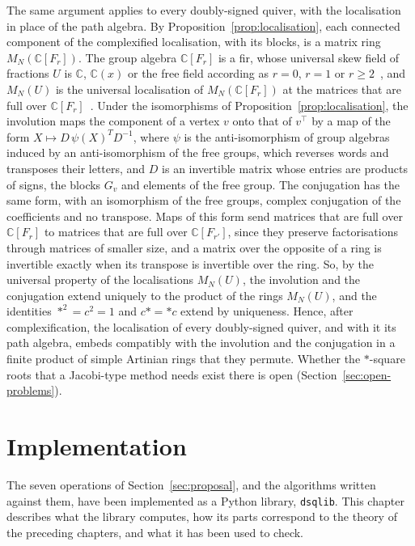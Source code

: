 \documentclass[12pt, a4paper]{report}
\theoremstyle{plain}
\theoremstyle{definition}
\theoremstyle{remark}
\theoremstyle{plain}
\newcommand{\CC}{\mathbb{C}}
\begin{document}
The same argument applies to every doubly-signed quiver, with the localisation in place of the path algebra. By Proposition~\ref{prop:localisation}, each connected component of the complexified localisation, with its blocks, is a matrix ring $M_N(\CC[F_r])$. The group algebra $\CC[F_r]$ is a fir, whose universal skew field of fractions $U$ is $\CC$, $\CC(x)$ or the free field according as $r=0$, $r=1$ or $r\geq2$~\cite{Cohn2006,Lewin1974}, and $M_N(U)$ is the universal localisation of $M_N(\CC[F_r])$ at the matrices that are full over $\CC[F_r]$~\cite[Chapter~7]{Cohn2006}. Under the isomorphisms of Proposition~\ref{prop:localisation}, the involution maps the component of a vertex $v$ onto that of $v^{\top}$ by a map of the form $X\mapsto D\,\psi(X)^TD^{-1}$, where $\psi$ is the anti-isomorphism of group algebras induced by an anti-isomorphism of the free groups, which reverses words and transposes their letters, and $D$ is an invertible matrix whose entries are products of signs, the blocks $G_v$ and elements of the free group. The conjugation has the same form, with an isomorphism of the free groups, complex conjugation of the coefficients and no transpose. Maps of this form send matrices that are full over $\CC[F_r]$ to matrices that are full over $\CC[F_{r'}]$, since they preserve factorisations through matrices of smaller size, and a matrix over the opposite of a ring is invertible exactly when its transpose is invertible over the ring. So, by the universal property of the localisations $M_N(U)$, the involution and the conjugation extend uniquely to the product of the rings $M_N(U)$, and the identities $*^2=c^2=1$ and $c*=*c$ extend by uniqueness. Hence, after complexification, the localisation of every doubly-signed quiver, and with it its path algebra, embeds compatibly with the involution and the conjugation in a finite product of simple Artinian rings that they permute. Whether the $*$-square roots that a Jacobi-type method needs exist there is open (Section~\ref{sec:open-problems}).
\chapter{Implementation}
\label{chap:implementation}

The seven operations of Section~\ref{sec:proposal}, and the algorithms written against them, have been implemented as a Python library, \texttt{dsqlib}. This chapter describes what the library computes, how its parts correspond to the theory of the preceding chapters, and what it has been used to check.
\end{document}
